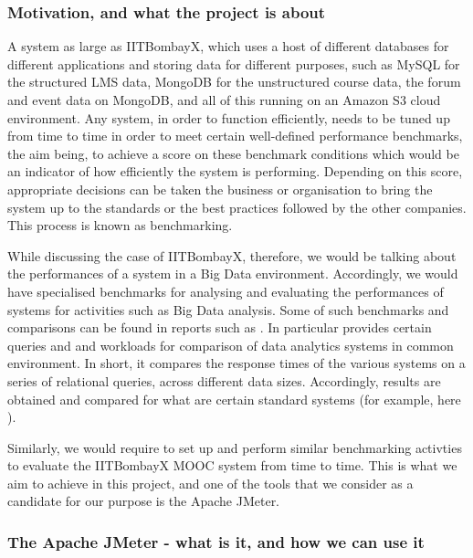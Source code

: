 \documentclass[14pt]{article}
\begin{document}
\subsubsection{Motivation, and what the project is about}
A system as large as IITBombayX, which uses a host of different databases for different applications and storing data for different purposes, such as MySQL for the structured LMS data, MongoDB for the unstructured course data, the forum and event data on MongoDB, and all of this running on an Amazon S3 cloud environment. Any system, in order to function efficiently, needs to be tuned up from time to time in order to meet certain well-defined performance benchmarks, the aim being, to achieve a score on these benchmark conditions which would be an indicator of how efficiently the system is performing. Depending on this score, appropriate decisions can be taken the business or organisation to bring the system up to the standards or the best practices followed by the other companies. This process is known as benchmarking. 

While discussing the case of IITBombayX, therefore, we would be talking about the performances of a system in a Big Data environment. Accordingly, we would have specialised benchmarks for analysing and evaluating the performances of systems for activities such as Big Data analysis. Some of such benchmarks and comparisons can be found in reports such as \cite{pavlo2009comparison}. In particular provides certain queries and and workloads for comparison of data analytics systems in common environment. In short, it compares the response times of the various systems on a series of relational queries, across different data sizes. Accordingly, results are obtained and compared for what are certain standard systems (for example, here \cite{pavlobenchmark}).

Similarly, we would require to set up and perform similar benchmarking activties to evaluate the IITBombayX MOOC system from time to time. This is what we aim to achieve in this project, and one of the tools that we consider as a candidate for our purpose is the Apache JMeter.

\subsubsection{The Apache JMeter - what is it, and how we can use it}
\end{document}
